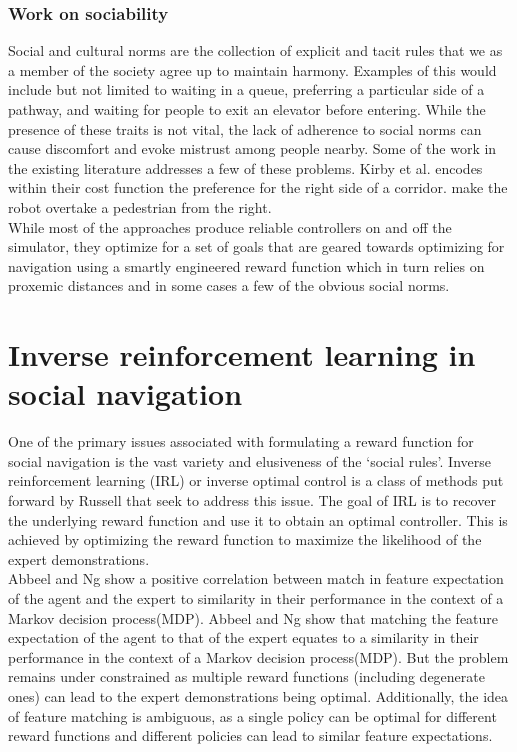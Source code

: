 \subsubsection{Work on sociability}
Social and cultural norms are the collection of explicit and tacit rules that we as a member of the society agree up to maintain harmony. Examples of this would include but not limited to waiting in a queue, preferring a particular side of a pathway, and waiting for people to exit an elevator before entering. While the presence of these traits is not vital, the lack of adherence to social norms can cause discomfort and evoke mistrust among people nearby. Some of the work in the existing literature addresses a few of these problems. Kirby et al. \cite{kriby_companion_2009} encodes within their cost function the preference for the right side of a corridor. \cite{pandey_alami_robot_guide_2009} make the robot overtake a pedestrian from the right.\\

While most of the approaches produce reliable controllers on and off the simulator, they optimize for a set of goals that are geared towards optimizing for navigation using a smartly engineered reward function which in turn relies on proxemic distances and in some cases a few of the obvious social norms.\\

\section{Inverse reinforcement learning in social navigation}
One of the primary issues associated with formulating a reward function for social navigation is the vast variety and elusiveness of the `social rules'. Inverse reinforcement learning (IRL) or inverse optimal control is a class of methods put forward by Russell \cite{russel_irl_1998} that seek to address this issue. The goal of IRL is to recover the underlying reward function and use it to obtain an optimal controller. This is achieved by optimizing the reward function to maximize the likelihood of the expert demonstrations.\\
Abbeel and Ng \cite{abbeel_apprenticeshiplearning_2004} show a positive correlation between match in feature expectation of the agent and the expert to similarity in their performance in the context of a Markov decision process(MDP).
Abbeel and Ng \cite{abbeel_apprenticeshiplearning_2004} show that matching the feature expectation of the agent to that of the expert equates to a similarity in their performance in the context of a Markov decision process(MDP). But the problem remains under constrained as multiple reward functions (including degenerate ones) can lead to the expert demonstrations being optimal. Additionally, the idea of feature matching is ambiguous, as a single policy can be optimal for different reward functions and different policies can lead to similar feature expectations. \\

